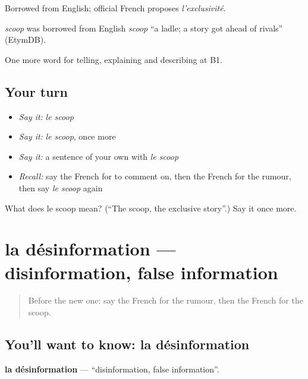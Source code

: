 Borrowed from English; official French proposes \emph{l'exclusivité}.

\begin{cousinweb}
\emph{scoop} was borrowed from English \emph{scoop} \textquotedblleft{}a ladle; a story got ahead of rivals\textquotedblright{} (EtymDB).
\end{cousinweb}

\begin{grammarlens}[title={What you've built}]
One more word for telling, explaining and describing at B1.
\end{grammarlens}

\subsection*{Your turn}
\begin{itemize}
\raggedright
  \item \emph{Say it:} \emph{le scoop}
  \item \emph{Say it:} \emph{le scoop}, once more
  \item \emph{Say it:} a sentence of your own with \emph{le scoop}
  \item \emph{Recall:} say the French for to comment on, then the French for the rumour, then say \emph{le scoop} again
\end{itemize}

\begin{tcolorbox}[breakable,colback=teal!4,colframe=teal!35!black,title={Before you move on}]
What does le scoop mean? (\textquotedblleft{}The scoop, the exclusive story\textquotedblright{}.) Say it once more.
\end{tcolorbox}
\section[la désinformation]{la désinformation — disinformation, false information}

\label{lesson:FR-C285-desinformation}



\begin{quote}
Before the new one: say the French for the rumour, then the French for the scoop.
\end{quote}

\subsection*{You'll want to know: la désinformation}
\textbf{la désinformation} — \textquotedblleft{}disinformation, false information\textquotedblright{}.

